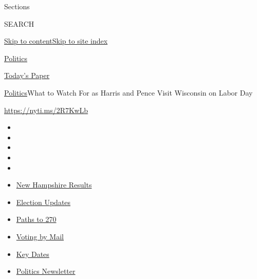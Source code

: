 Sections

SEARCH

\protect\hyperlink{site-content}{Skip to
content}\protect\hyperlink{site-index}{Skip to site index}

\href{https://www.nytimes3xbfgragh.onion/section/politics}{Politics}

\href{https://myaccount.nytimes3xbfgragh.onion/auth/login?response_type=cookie\&client_id=vi}{}

\href{https://www.nytimes3xbfgragh.onion/section/todayspaper}{Today's
Paper}

\href{/section/politics}{Politics}\textbar{}What to Watch For as Harris
and Pence Visit Wisconsin on Labor Day

\url{https://nyti.ms/2R7KwLb}

\begin{itemize}
\item
\item
\item
\item
\item
\end{itemize}

\begin{itemize}
\item
  \href{https://www.nytimes3xbfgragh.onion/interactive/2020/09/08/us/elections/results-new-hampshire-primary-elections.html?action=click\&pgtype=Article\&state=default\&region=TOP_BANNER\&context=storylines_menu}{New
  Hampshire Results}
\item
  \href{https://www.nytimes3xbfgragh.onion/live/2020/09/08/us/trump-vs-biden?action=click\&pgtype=Article\&state=default\&region=TOP_BANNER\&context=storylines_menu}{Election
  Updates}
\item
  \href{https://www.nytimes3xbfgragh.onion/interactive/2020/us/elections/election-states-biden-trump.html?action=click\&pgtype=Article\&state=default\&region=TOP_BANNER\&context=storylines_menu}{Paths
  to 270}
\item
  \href{https://www.nytimes3xbfgragh.onion/interactive/2020/08/31/us/politics/vote-by-mail-deadlines.html?action=click\&pgtype=Article\&state=default\&region=TOP_BANNER\&context=storylines_menu}{Voting
  by Mail}
\item
  \href{https://www.nytimes3xbfgragh.onion/interactive/2019/us/elections/2020-presidential-election-calendar.html?action=click\&pgtype=Article\&state=default\&region=TOP_BANNER\&context=storylines_menu}{Key
  Dates}
\item
  \href{https://www.nytimes3xbfgragh.onion/newsletters/politics?action=click\&pgtype=Article\&state=default\&region=TOP_BANNER\&context=storylines_menu}{Politics
  Newsletter}
\end{itemize}

